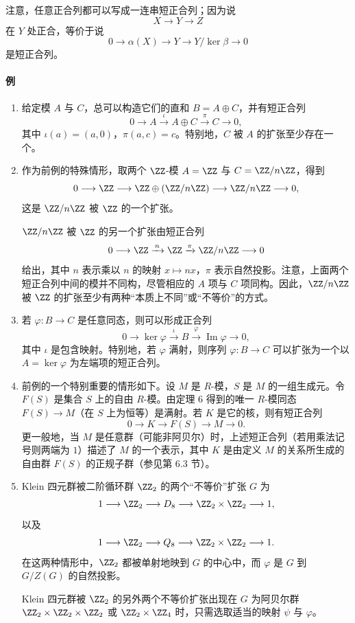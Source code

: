 注意，任意正合列都可以写成一连串短正合列；因为说
\[
X\longrightarrow Y\longrightarrow Z
\]
在 $Y$ 处正合，等价于说
\[
0\longrightarrow \alpha(X)\longrightarrow Y\longrightarrow Y/\ker\beta\longrightarrow0
\]
是短正合列。

\paragraph{例}
\begin{enumerate}[label=(\arabic*)]
\item 给定模 $A$ 与 $C$，总可以构造它们的直和 $B=A\oplus C$，并有短正合列
\[
0\longrightarrow A\xrightarrow{\iota} A\oplus C\xrightarrow{\pi} C\longrightarrow0,
\]
其中 $\iota(a)=(a,0)$，$\pi(a,c)=c$。特别地，$C$ 被 $A$ 的扩张至少存在一个。

\item 作为前例的特殊情形，取两个 $\ZZ$-模 $A=\ZZ$ 与 $C=\ZZ/n\ZZ$，得到
\[
0\longrightarrow \ZZ\longrightarrow \ZZ\oplus(\ZZ/n\ZZ)\longrightarrow \ZZ/n\ZZ\longrightarrow0,
\]
这是 $\ZZ/n\ZZ$ 被 $\ZZ$ 的一个扩张。

$\ZZ/n\ZZ$ 被 $\ZZ$ 的另一个扩张由短正合列
\[
0\longrightarrow \ZZ\xrightarrow{\,n\,}\ZZ\xrightarrow{\pi}\ZZ/n\ZZ\longrightarrow0
\]
给出，其中 $n$ 表示乘以 $n$ 的映射 $x\mapsto nx$，$\pi$ 表示自然投影。注意，上面两个短正合列中间的模并不同构，尽管相应的 $A$ 项与 $C$ 项同构。因此，$\ZZ/n\ZZ$ 被 $\ZZ$ 的扩张至少有两种“本质上不同”或“不等价”的方式。

\item 若 $\varphi:B\to C$ 是任意同态，则可以形成正合列
\[
0\longrightarrow \ker\varphi\xrightarrow{\iota}B\xrightarrow{\varphi}\operatorname{Im}\varphi\longrightarrow0,
\]
其中 $\iota$ 是包含映射。特别地，若 $\varphi$ 满射，则序列 $\varphi:B\to C$ 可以扩张为一个以 $A=\ker\varphi$ 为左端项的短正合列。

\item 前例的一个特别重要的情形如下。设 $M$ 是 $R$-模，$S$ 是 $M$ 的一组生成元。令 $F(S)$ 是集合 $S$ 上的自由 $R$-模。由定理 6 得到的唯一 $R$-模同态 $F(S)\to M$（在 $S$ 上为恒等）是满射。若 $K$ 是它的核，则有短正合列
\[
0\longrightarrow K\longrightarrow F(S)\longrightarrow M\longrightarrow0.
\]
更一般地，当 $M$ 是任意群（可能非阿贝尔）时，上述短正合列（若用乘法记号则两端为 $1$）描述了 $M$ 的一个表示，其中 $K$ 是由定义 $M$ 的关系所生成的自由群 $F(S)$ 的正规子群（参见第 6.3 节）。

\item Klein 四元群被二阶循环群 $\ZZ_2$ 的两个“不等价”扩张 $G$ 为
\[
1\longrightarrow \ZZ_2\longrightarrow D_8\longrightarrow \ZZ_2\times\ZZ_2\longrightarrow1,
\]
以及
\[
1\longrightarrow \ZZ_2\longrightarrow Q_8\longrightarrow \ZZ_2\times\ZZ_2\longrightarrow1.
\]
在这两种情形中，$\ZZ_2$ 都被单射地映到 $G$ 的中心中，而 $\varphi$ 是 $G$ 到 $G/Z(G)$ 的自然投影。

Klein 四元群被 $\ZZ_2$ 的另外两个不等价扩张出现在 $G$ 为阿贝尔群 $\ZZ_2\times\ZZ_2\times\ZZ_2$ 或 $\ZZ_2\times\ZZ_4$ 时，只需选取适当的映射 $\psi$ 与 $\varphi$。
\end{enumerate}


